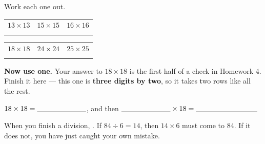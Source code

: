 \documentclass[12pt,a4paper]{article}
\begin{document}
\noindent Work each one out. 

\vspace{4pt}
\noindent
\begin{tabularx}{\textwidth}{|X|X|X|}
  \hline
  $13 \times 13$ & $15 \times 15$ & $16 \times 16$ \\
  \rule[-3.5em]{0pt}{4.3em} & & \\
  \hline
\end{tabularx}

\vspace{9pt}
\noindent
\begin{tabularx}{\textwidth}{|X|X|X|}
  \hline
  $18 \times 18$ & $24 \times 24$ & $25 \times 25$ \\
  \rule[-3.5em]{0pt}{4.3em} & & \\
  \hline
\end{tabularx}

\vspace{10pt}
\noindent\textbf{Now use one.} Your answer to $18 \times 18$ is the first half of a
check in Homework 4. Finish it here --- this one is \textbf{three digits by two},
so it takes two rows like all the rest.

\vspace{4pt}
\noindent\hspace*{1em}$18 \times 18 = \blank[2.4cm]$, and then
$\blank[2.4cm] \times 18 = \blank[3.0cm]$

\begin{workspace}[3.2cm]\end{workspace}



\begin{remember}
  When you finish a division, . If
  $84 \div 6 = 14$, then $14 \times 6$ must come to 84. If it does not, you have
  just caught your own mistake.
\end{remember}
\end{document}
